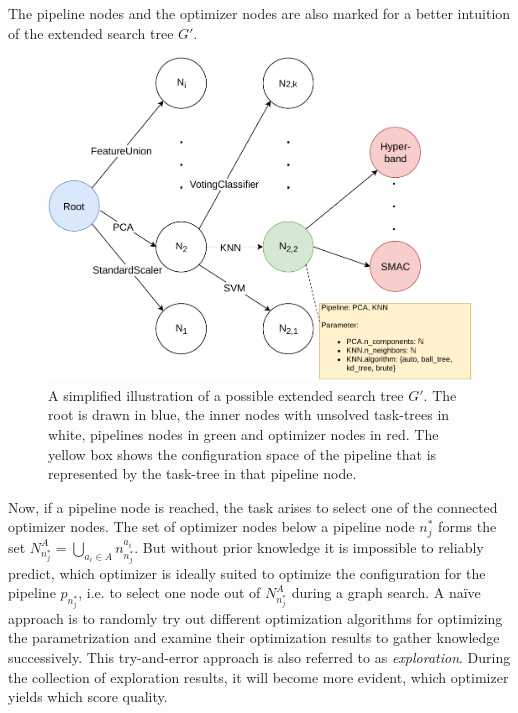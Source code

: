 The pipeline nodes and the optimizer nodes are also marked for a better intuition of the extended search tree $G'$.
\begin{figure}[ht!]
    \centering
    \includegraphics[width=\textwidth]{gfx/Figures/Approach/SearchGraph.pdf}
    \caption[A simplified illustration of a possible extended search tree $G'$.]{A simplified illustration of a possible extended search tree $G'$. The root is drawn in blue, the inner nodes with unsolved task-trees in white, pipelines nodes in green and optimizer nodes in red.
    The yellow box shows the configuration space of the pipeline that is represented by the task-tree in that pipeline node.}
    \label{fig:approach:search-graph}
\end{figure}

Now, if a pipeline node is reached, the task arises to select one of the connected optimizer nodes.
The set of optimizer nodes below a pipeline node $n^*_j$ forms the set $N^A_{n^*_j} = \bigcup_{a_i \in A} n^{a_i}_{n^*_j}$.
But without prior knowledge it is impossible to reliably predict, which optimizer is ideally suited to optimize the configuration for the pipeline $p_{n^*_j}$, i.e. to select one node out of $N^A_{n^*_j}$ during a graph search.\newline
A na\"ive approach is to randomly try out different optimization algorithms for optimizing the parametrization and examine their optimization results to gather knowledge successively.
This try-and-error approach is also referred to as \textit{exploration}.
During the collection of exploration results, it will become more evident, which optimizer yields which score quality.

